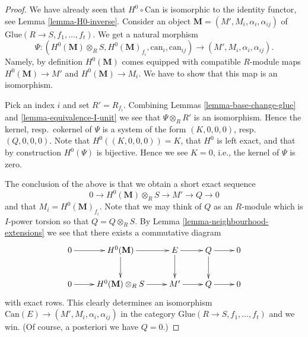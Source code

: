 \documentclass[10pt,a4paper]{amsart}
\theoremstyle{plain}
\theoremstyle{definition}
\theoremstyle{remark}
\numberwithin{equation}{subsection}
\begin{document}
\begin{proof}
We have already seen that $H^0 \circ \text{Can}$ is isomorphic to the
identity functor, see
Lemma \ref{lemma-H0-inverse}.
Consider an object $\mathbf{M} = (M', M_i, \alpha_i, \alpha_{ij})$
of $\text{Glue}(R \to S, f_1, \ldots, f_t)$.
We get a natural morphism
$$
\Psi :
(H^0(\mathbf{M}) \otimes_R S, H^0(\mathbf{M})_{f_i},
\text{can}_i, \text{can}_{ij})
\longrightarrow
(M', M_i, \alpha_i, \alpha_{ij}).
$$
Namely, by definition $H^0(\mathbf{M})$ comes equipped with compatible
$R$-module maps $H^0(\mathbf{M}) \to M'$ and $H^0(\mathbf{M}) \to M_i$.
We have to show that this map is an isomorphism.

\medskip\noindent
Pick an index $i$ and set $R' = R_{f_i}$. Combining
Lemmas \ref{lemma-base-change-glue} and \ref{lemma-equivalence-I-unit}
we see that $\Psi \otimes_R R'$ is an isomorphism.
Hence the kernel, resp.\ cokernel of $\Psi$ is a system of the form
$(K, 0, 0, 0)$, resp.\ $(Q, 0, 0, 0)$. Note that
$H^0((K, 0, 0, 0)) = K$, that $H^0$ is left exact, and that by
construction $H^0(\Psi)$ is bijective. Hence we see $K = 0$, i.e.,
the kernel of $\Psi$ is zero.

\medskip\noindent
The conclusion of the above is that we obtain a short exact sequence
$$
0 \to H^0(\mathbf{M}) \otimes_R S \to M' \to Q \to 0
$$
and that $M_i = H^0(\mathbf{M})_{f_i}$.
Note that we may think of $Q$ as an $R$-module which is $I$-power
torsion so that $Q = Q \otimes_R S$. By
Lemma \ref{lemma-neighbourhood-extensions}
we see that there exists a commutative diagram
$$
\xymatrix{
0 \ar[r] &
H^0(\mathbf{M}) \ar[r] \ar[d] &
E \ar[r] \ar[d] &
Q \ar[r] \ar[d] &
0 \\
0 \ar[r] &
H^0(\mathbf{M}) \otimes_R S \ar[r] &
M' \ar[r] &
Q \ar[r] &
0
}
$$
with exact rows. This clearly determines an isomorphism
$\text{Can}(E) \to (M', M_i, \alpha_i, \alpha_{ij})$
in the category $\text{Glue}(R \to S, f_1, \ldots, f_t)$
and we win. (Of course, a posteriori we have $Q = 0$.)
\end{proof}
\end{document}
